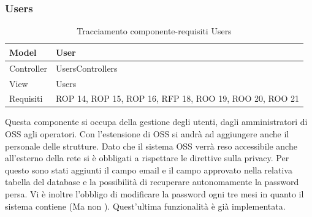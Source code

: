 \subsubsection{Users}
\def\arraystretch{2}
\begin{table}[H]
\centering
\begin{tabular}{|l|l|}
\hline
Model & User \\ \hline
Controller & UsersControllers \\ \hline
View & Users \\ \hline
Requisiti & ROP 14, ROP 15, ROP 16, RFP 18, ROO 19, ROO 20, ROO 21 \\ \hline
\end{tabular}
\caption{Tracciamento componente-requisiti Users}
\end{table}
Questa componente si occupa della gestione degli utenti, dagli amministratori di OSS agli operatori. Con l'estensione di OSS si andrà ad aggiungere anche il personale delle strutture.
Dato che il sistema OSS verrà reso accessibile anche all'esterno della rete \net si è obbligati a rispettare le direttive sulla privacy. Per questo sono stati aggiunti il campo email e il campo approvato nella relativa tabella del database  e la possibilità di recuperare autonomamente la password persa. Vi è inoltre l'obbligo di modificare la password ogni tre mesi in quanto il sistema contiene  (Ma non ).
Quest'ultima funzionalità è già implementata.

\begin{table}[H]
\centering
{}
\caption{Controller:UsersController}
\end{table}



